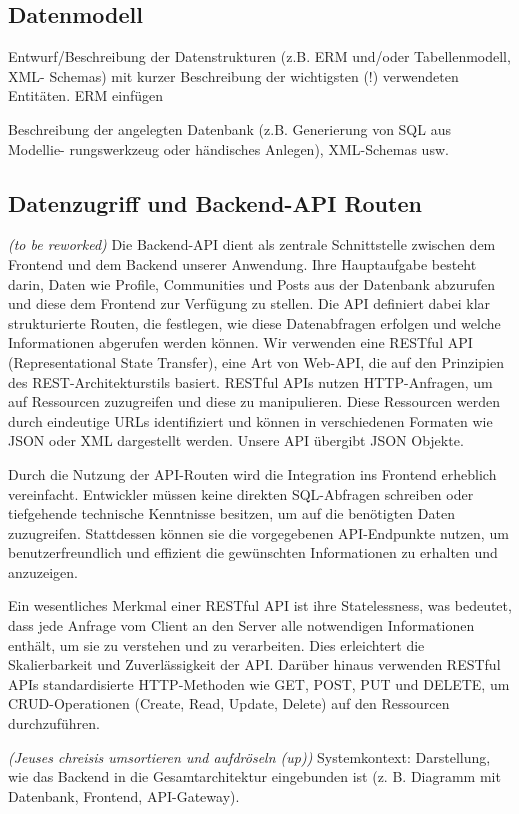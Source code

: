 \documentclass[a4paper,12pt]{article}
\begin{document}
\subsection{Datenmodell}
Entwurf/Beschreibung der Datenstrukturen (z.B. ERM
und/oder Tabellenmodell, XML- Schemas) mit kurzer Beschreibung der wichtigsten
(!) verwendeten Entitäten. ERM einfügen 

Beschreibung der angelegten Datenbank (z.B. Generierung von SQL aus Modellie-
rungswerkzeug oder händisches Anlegen), XML-Schemas usw.

\subsection{Datenzugriff und Backend-API Routen}
\textit{(to be reworked)}
Die Backend-API dient als zentrale Schnittstelle zwischen dem Frontend und dem Backend unserer Anwendung. Ihre Hauptaufgabe besteht darin, Daten wie Profile, Communities und Posts aus der Datenbank abzurufen und diese dem Frontend zur Verfügung zu stellen. Die API definiert dabei klar strukturierte Routen, die festlegen, wie diese Datenabfragen erfolgen und welche Informationen abgerufen werden können. Wir verwenden eine RESTful API (Representational State Transfer), eine Art von Web-API, die auf den Prinzipien des REST-Architekturstils basiert. RESTful APIs nutzen HTTP-Anfragen, um auf Ressourcen zuzugreifen und diese zu manipulieren. Diese Ressourcen werden durch eindeutige URLs identifiziert und können in verschiedenen Formaten wie JSON oder XML dargestellt werden. Unsere API übergibt JSON Objekte. 

Durch die Nutzung der API-Routen wird die Integration ins Frontend erheblich vereinfacht. Entwickler müssen keine direkten SQL-Abfragen schreiben oder tiefgehende technische Kenntnisse besitzen, um auf die benötigten Daten zuzugreifen. Stattdessen können sie die vorgegebenen API-Endpunkte nutzen, um benutzerfreundlich und effizient die gewünschten Informationen zu erhalten und anzuzeigen. 

Ein wesentliches Merkmal einer RESTful API ist ihre Statelessness, was bedeutet, dass jede Anfrage vom Client an den Server alle notwendigen Informationen enthält, um sie zu verstehen und zu verarbeiten. Dies erleichtert die Skalierbarkeit und Zuverlässigkeit der API. Darüber hinaus verwenden RESTful APIs standardisierte HTTP-Methoden wie GET, POST, PUT und DELETE, um CRUD-Operationen (Create, Read, Update, Delete) auf den Ressourcen durchzuführen. 

\textit{(Jeuses chreisis umsortieren und aufdröseln (up))}
Systemkontext: Darstellung, wie das Backend in die Gesamtarchitektur
eingebunden ist (z. B. Diagramm mit Datenbank, Frontend, API-Gateway).
\end{document}
